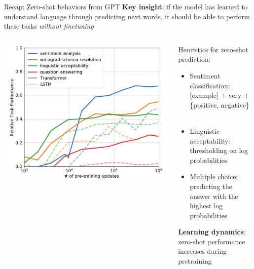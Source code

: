 \documentclass[usenames,dvipsnames,notes,11pt,aspectratio=169,hyperref={colorlinks=true, linkcolor=blue}]{beamer}
\begin{document}
\begin{frame}
    {Recap: Zero-shot behaviors from GPT}
    \textbf{Key insight}: if the model has learned to understand language through predicting next words, it should be able to perform these tasks {\em without finetuning}

    \vspace{1em}
    \pause
    \begin{columns}
        \begin{column}{0.4\textwidth}
        \includegraphics[width=\textwidth]{figures/gpt1-zs}
        \end{column}
        \begin{column}{0.6\textwidth}
            Heuristics for zero-shot prediction:
            \begin{itemize}
                \item Sentiment classification: [example] + very + \{positive, negative\} $\quad$ 
                \item Linguistic acceptability: thresholding on log probabilities
                \item Multiple choice: predicting the answer with the highest log probabilities
            \end{itemize}
            \textbf{Learning dynamics}: zero-shot performance increases during pretraining
        \end{column}
    \end{columns}
\end{frame}
\end{document}
